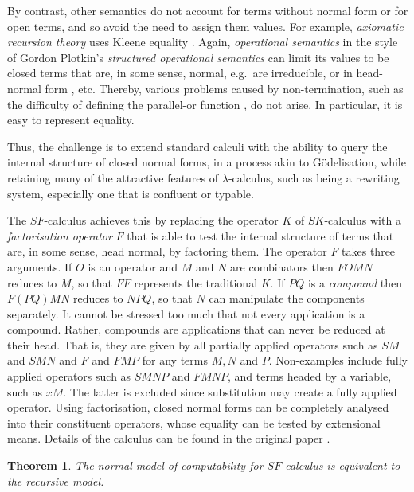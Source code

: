 \documentclass[a4paper]{article}
\newtheorem{theorem}{Theorem}
\begin{document}
By contrast, other semantics do not account for terms without normal
form or for open terms, and so avoid the need to assign them values.
For example, {\em axiomatic recursion theory} \cite{Rogers67, Jones97}
uses Kleene equality \cite[page 327]{Kleene52}.  Again, {\em operational semantics} in the style
of Gordon Plotkin's {\em structured operational semantics}
\cite{Plotkin04} can limit its values to be closed terms that are, in
some sense, normal, e.g.\ are irreducible, or in head-normal form
\cite{Bare84a}, etc. Thereby, various problems caused by non-termination,
such as the difficulty of defining the parallel-or function
\cite{Abramsky00}, do not arise. In particular, it is easy to
represent equality.


Thus, the challenge is to extend standard calculi with the ability to
query the internal structure of closed normal forms, in a process akin
to G\"odelisation, while retaining many of the attractive features of
$\lambda$-calculus, such as being a rewriting system, especially one that
is confluent or typable.



The $SF$-calculus achieves this by replacing the operator $K$ of
$SK$-calculus with a {\em factorisation operator} $F$ that is able to
test the internal structure of terms that are, in some sense, head
normal, by factoring them.  The operator $F$ takes three arguments. If
$O$ is an operator and $M$ and $N$ are combinators then $FOMN$ reduces
to $M$, so that $FF$ represents the traditional $K$. If $PQ$ is a {\em
  compound} then $F(PQ)MN$ reduces to $NPQ$, so that $N$ can
manipulate the components separately. It cannot be stressed too much
that not every application is a compound.  Rather, compounds are
applications that can never be reduced at their head.  That is, they
are given by all partially applied operators such as $SM$ and $SMN$
and $F$ and $FMP$ for any terms $M, N$ and $P$.  Non-examples include
fully applied operators such as $SMNP$ and $FMNP$, and terms headed by
a variable, such as $xM$. The latter is excluded since substitution
may create a fully applied operator. Using factorisation, closed
normal forms can be completely analysed into their constituent
operators, whose equality can be tested by extensional means.  Details of the calculus
can be found in the original paper \cite{JGW11}.


\begin{theorem}
  The normal model of computability for $SF$-calculus is equivalent
  to the recursive model. 
\end{theorem}
\end{document}
